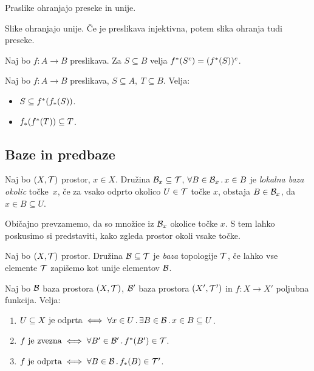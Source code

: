 \begin{trditev}
    Praslike ohranjajo preseke in unije.
\end{trditev}

\begin{trditev}
    Slike ohranjajo unije. Če je preslikava injektivna, potem slika ohranja tudi preseke.
\end{trditev}

\begin{trditev}
    Naj bo $f: A \to B$ preslikava. Za $S \subseteq B$ velja $f^{*}(S^c) = (f^{*}(S))^c$.
\end{trditev}

\begin{trditev}
    Naj bo $f: A \to B$ preslikava, $S \subseteq A, \ T \subseteq B$. Velja:
    \begin{itemize}
        \item $S \subseteq f^{*}(f_{*}(S))$.
        \item $f_{*}(f^{*}(T)) \subseteq T$.
    \end{itemize}
\end{trditev}

\subsection{Baze in predbaze}

\begin{definicija}
    Naj bo $(X, \mathcal{T})$ prostor, $x \in X$. Družina $\mathcal{B}_x \subseteq \mathcal{T}$, $\forall B \in \mathcal{B}_x \,.\, x \in B$ je \emph{lokalna baza okolic} točke~$x$, če za vsako odprto okolico $U \in \mathcal{T}$ točke $x$, obstaja $B \in \mathcal{B}_x$, da $x \in B \subseteq U$.
\end{definicija}

\begin{opomba}
    Običajno prevzamemo, da so množice iz $\mathcal{B}_x$ okolice točke $x$. S tem lahko poskusimo si predstaviti, kako zgleda prostor okoli vsake točke.
\end{opomba}

\begin{definicija}
    Naj bo $(X, \mathcal{T})$ prostor. Družina $\mathcal{B} \subseteq \mathcal{T}$ je \emph{baza} topologije $\mathcal{T}$, če lahko vse elemente $\mathcal{T}$ zapišemo kot unije elementov $\mathcal{B}$.
\end{definicija}

\begin{trditev}
    Naj bo $\mathcal{B}$ baza prostora $(X, \mathcal{T})$, $\mathcal{B}'$ baza prostora $(X', \mathcal{T}')$ in $f: X \to X'$ poljubna funkcija. Velja:
    \begin{enumerate}
        \item $U \subseteq X \text{ je odprta} \iff \forall x \in U \,.\, \exists B \in \mathcal{B} \,.\, x \in B \subseteq U$.
        \item $f \text{ je zvezna} \iff \forall B' \in \mathcal{B}' \,.\, f^{*}(B') \in \mathcal{T}$.
        \item $f \text{ je odprta} \iff \forall B \in \mathcal{B} \,.\, f_{*}(B) \in \mathcal{T}'$.
    \end{enumerate}
\end{trditev}

